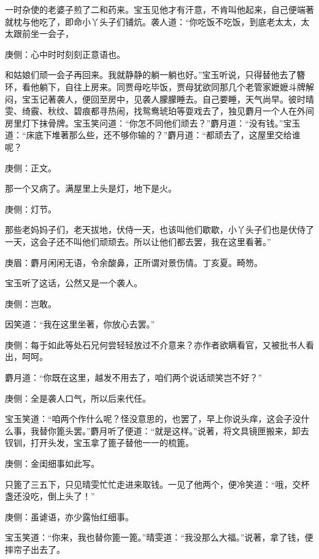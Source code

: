 \begin{parag}
    一时杂使的老婆子煎了二和药来。宝玉见他才有汗意，不肯叫他起来，自己便端著就枕与他吃了，即命小丫头子们铺炕。袭人道：“你吃饭不吃饭，到底老太太，太太跟前坐一会子，\begin{note}庚侧：心中时时刻刻正意语也。\end{note}和姑娘们顽一会子再回来。我就静静的躺一躺也好。”宝玉听说，只得替他去了簪环，看他躺下，自往上房来。同贾母吃毕饭，贾母犹欲同那几个老管家嬷嬷斗牌解闷，宝玉记著袭人，便回至房中，见袭人朦朦睡去。自己要睡，天气尚早。彼时晴雯、绮霰、秋纹、碧痕都寻热闹，找鸳鸯琥珀等耍戏去了，独见麝月一个人在外间房里灯下抹骨牌。宝玉笑问道：“你怎不同他们顽去？”麝月道：“没有钱。”宝玉道：“床底下堆著那么些，还不够你输的？”麝月道：“都顽去了，这屋里交给谁呢？\begin{note}庚侧：正文。\end{note}那一个又病了。满屋里上头是灯，地下是火。\begin{note}庚侧：灯节。\end{note}那些老妈妈子们，老天拔地，伏侍一天，也该叫他们歇歇，小丫头子们也是伏侍了一天，这会子还不叫他们顽顽去。所以让他们都去罢，我在这里看著。”\begin{note}庚眉：麝月闲闲无语，令余酸鼻，正所谓对景伤情。丁亥夏。畸笏。\end{note}
\end{parag}


\begin{parag}
    宝玉听了这话，公然又是一个袭人。\begin{note}庚侧：岂敢。\end{note}因笑道：“我在这里坐著，你放心去罢。”\begin{note}庚侧：每于如此等处石兄何尝轻轻放过不介意来？亦作者欲瞒看官，又被批书人看出，呵呵。\end{note}麝月道：“你既在这里，越发不用去了，咱们两个说话顽笑岂不好？”\begin{note}庚侧：全是袭人口气，所以后来代任。\end{note}宝玉笑道：“咱两个作什么呢？怪没意思的，也罢了，早上你说头痒，这会子没什么事，我替你篦头罢。”麝月听了便道：“就是这样。”说著，将文具镜匣搬来，卸去钗钏，打开头发，宝玉拿了篦子替他一一的梳篦。\begin{note}庚侧：金闺细事如此写。\end{note}只篦了三五下，只见晴雯忙忙走进来取钱。一见了他两个，便冷笑道：“哦，交杯盏还没吃，倒上头了！”\begin{note}庚侧：虽谑语，亦少露怡红细事。\end{note}宝玉笑道：“你来，我也替你篦一篦。”晴雯道：“我没那么大福。”说著，拿了钱，便摔帘子出去了。
\end{parag}


